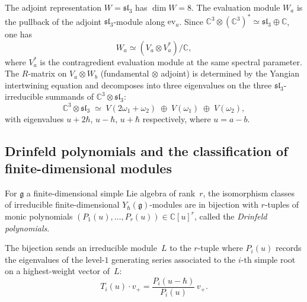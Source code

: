 \begin{computation}
\label{comp:sl3-eval-adjoint}
The adjoint representation $W=\mathfrak{sl}_3$ has
$\dim W=8$. The evaluation module $W_a$ is the pullback
of the adjoint $\mathfrak{sl}_3$-module along
$\mathrm{ev}_a$. Since
$\mathbb{C}^3\otimes(\mathbb{C}^3)^*\simeq
\mathfrak{sl}_3\oplus\mathbb{C}$, one has
\[
W_a\simeq (V_a\otimes V^*_a)/\mathbb{C},
\]
where $V^*_a$ is the contragredient evaluation module at the
same spectral parameter. The $R$-matrix on $V_a\otimes W_b$
\textup{(}fundamental $\otimes$ adjoint\textup{)} is determined by
the Yangian intertwining equation and decomposes into three
eigenvalues on the three $\mathfrak{sl}_3$-irreducible summands
of $\mathbb{C}^3\otimes\mathfrak{sl}_3$:
\[
\mathbb{C}^3\otimes\mathfrak{sl}_3
\;\simeq\;
V(2\omega_1+\omega_2)\;\oplus\;V(\omega_1)\;\oplus\;V(\omega_2),
\]
with eigenvalues $u+2\hbar$, $u-\hbar$, $u+\hbar$
respectively, where $u=a-b$.
\end{computation}

\subsection{Drinfeld polynomials and the classification of finite-dimensional modules}

\begin{theorem}
\label{thm:drinfeld-classification}
For $\mathfrak{g}$ a finite-dimensional simple Lie algebra
of rank~$r$, the isomorphism classes of irreducible
finite-dimensional $Y_\hbar(\mathfrak{g})$-modules are in
bijection with $r$-tuples of monic polynomials
$(P_1(u),\dots,P_r(u))\in\mathbb{C}[u]^r$, called the
\emph{Drinfeld polynomials}.

The bijection sends an irreducible module~$L$ to the
$r$-tuple where $P_i(u)$ records the eigenvalues of the
level-$1$ generating series associated to the $i$-th simple
root on a highest-weight vector of~$L$:
\[
T_i(u)\cdot v_+
=
\frac{P_i(u-\hbar)}{P_i(u)}\,v_+.
\]
\end{theorem}

